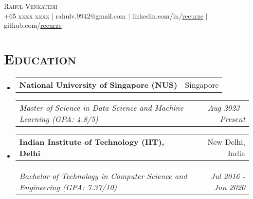\documentclass{article}
\makeatletter
\newcommand{\headerrow}[2]
{\begin{tabular*}{\linewidth}{l@{\extracolsep{\fill}}r}
    #1 &
    #2 \\
\end{tabular*}}
\makeatother
\begin{document}
\thispagestyle{empty}

\begin{center}
    {\huge \textsc{Rahul Venkatesh}} \\[2pt]
    +65 xxxx xxxx
    $\mid$
    rahulv.9942@gmail.com
    $\mid$
    linkedin.com/in/\href{https://www.linkedin.com/in/recurze}{recurze}
    $\mid$
    github.com/\href{https://github.com/recurze}{recurze}
\end{center}

\section*{\textsc{\textbf{Education}}}
\begin{itemize}[leftmargin=0em]

\item[]
    \headerrow {\textbf{National University of Singapore (NUS)}}{Singapore}
    \headerrow {\emph{Master of Science in Data Science and Machine Learning (GPA: 4.8/5)}}{\emph{Aug 2023 - Present}}

\item[]
    \headerrow {\textbf{Indian Institute of Technology (IIT), Delhi}}{New Delhi, India}
    \headerrow {\emph{Bachelor of Technology in Computer Science and Engineering (GPA: 7.37/10)}}{\emph{Jul 2016 - Jun 2020}}

\end{itemize}

%
\end{document}
